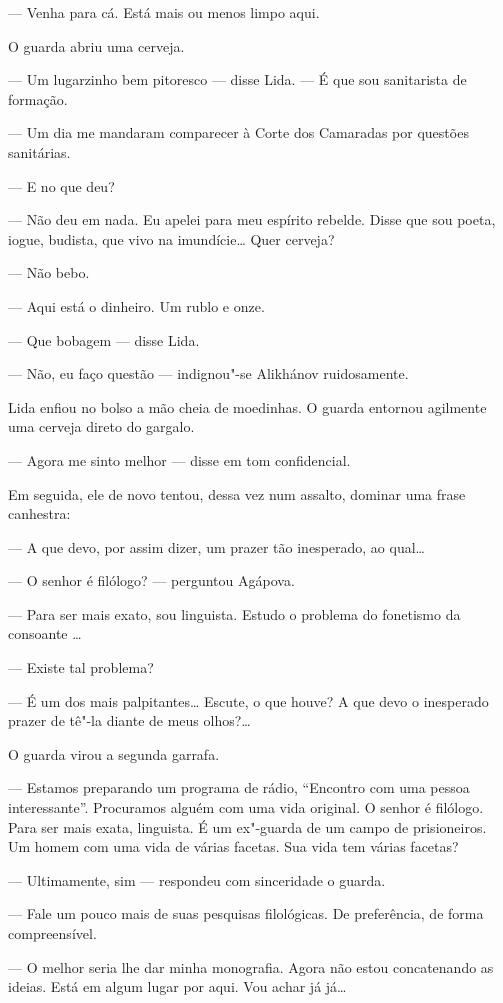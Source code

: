 --- Venha para cá. Está mais ou menos limpo aqui.

O guarda abriu uma cerveja.

--- Um lugarzinho bem pitoresco --- disse Lida. --- É que sou sanitarista
de formação.

--- Um dia me mandaram comparecer à Corte dos Camaradas por questões
sanitárias.

--- E no que deu?

--- Não deu em nada. Eu apelei para meu espírito rebelde. Disse que sou
poeta, iogue, budista, que vivo na imundície\ldots{} Quer cerveja?

--- Não bebo.

--- Aqui está o dinheiro. Um rublo e onze.

--- Que bobagem --- disse Lida.

--- Não, eu faço questão --- indignou"-se Alikhánov ruidosamente.

Lida enfiou no bolso a mão cheia de moedinhas. O guarda entornou
agilmente uma cerveja direto do gargalo.

--- Agora me sinto melhor --- disse em tom confidencial.

Em seguida, ele de novo tentou, dessa vez num assalto, dominar uma frase
canhestra:

--- A que devo, por assim dizer, um prazer tão inesperado, ao qual\ldots{}

--- O senhor é filólogo? --- perguntou Agápova.

--- Para ser mais exato, sou linguista. Estudo o problema do fonetismo
da consoante \ldots{}

--- Existe tal problema?

--- É um dos mais palpitantes\ldots{} Escute, o que houve? A que devo o
inesperado prazer de tê"-la diante de meus olhos?\ldots{}

O guarda virou a segunda garrafa.

--- Estamos preparando um programa de rádio, ``Encontro com uma pessoa
interessante''. Procuramos alguém com uma vida original. O senhor é
filólogo. Para ser mais exata, linguista. É um ex"-guarda de um campo de
prisioneiros. Um homem com uma vida de várias facetas. Sua vida tem
várias facetas?

--- Ultimamente, sim --- respondeu com sinceridade o guarda.

--- Fale um pouco mais de suas pesquisas filológicas. De preferência, de
forma compreensível.

--- O melhor seria lhe dar minha monografia. Agora não estou
concatenando as ideias. Está em algum lugar por aqui. Vou achar já já\ldots{}

